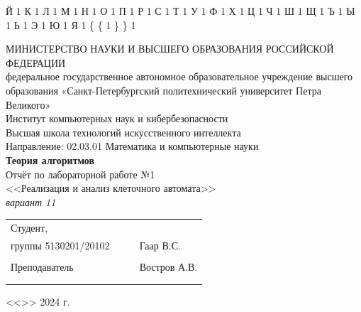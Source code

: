 \documentclass[a4paper, final]{article}
\begin{document}
{  {Й}{ {\selectfont{}} }1
  {К}{ {\selectfont{}} }1
  {Л}{ {\selectfont{}} }1
  {М}{ {\selectfont{}} }1
  {Н}{ {\selectfont{}} }1
  {О}{ {\selectfont{}} }1
  {П}{ {\selectfont{}} }1
  {Р}{ {\selectfont{}} }1
  {С}{ {\selectfont{}} }1
  {Т}{ {\selectfont{}} }1
  {У}{ {\selectfont{}} }1
  {Ф}{ {\selectfont{}} }1
  {Х}{ {\selectfont{}} }1
  {Ц}{ {\selectfont{}} }1
  {Ч}{ {\selectfont{}} }1
  {Ш}{ {\selectfont{}} }1
  {Щ}{ {\selectfont{}} }1
  {Ъ}{ {\selectfont{}} }1
  {Ы}{ {\selectfont{}} }1
  {Ь}{ {\selectfont{}} }1
  {Э}{ {\selectfont{}} }1
  {Ю}{ {\selectfont{}} }1
  {Я}{ {\selectfont{}} }1
  {\{}{ { {\color{brackets}\{} } }1 %
  {\} }{ { {\color{brackets}\} } } }1 %
}

\begin{center}
\hfill \break
\hfill \break
\normalsize{МИНИСТЕРСТВО НАУКИ И ВЫСШЕГО ОБРАЗОВАНИЯ РОССИЙСКОЙ ФЕДЕРАЦИИ\\
 федеральное государственное автономное образовательное учреждение высшего образования «Санкт-Петербургский политехнический университет Петра Великого»\\[5pt]}
\normalsize{Институт компьютерных наук и кибербезопасности}\\[5pt] 
\normalsize{Высшая школа технологий искусственного интеллекта}\\[5pt] 
\normalsize{Направление: 02.03.01 Математика и компьютерные науки}\\

\hfill \break
\hfill \break
\hfill \break
\large{\textbf{Теория алгоритмов}}\\
\large{Отчёт по лабораторной работе №1}\\
\large{<<Реализация и анализ клеточного автомата>>}\\
\large{\textit{вариант 11\\}}

\hfill \break
\hfill \break
\end{center}
 
\small{ 
\begin{tabular}{lrrl}
\!\!\!Студент, & \hspace{2cm} & & \\
\!\!\!группы 5130201/20102 & \hspace{2cm} & \underline{\hspace{3cm}} & Гаар В.С. \\\\
\!\!\!Преподаватель & \hspace{2cm} & \underline{\hspace{3cm}} &  Востров А.В. \\\\
&&\hspace{5cm}
\end{tabular}
\begin{flushright}
<<\underline{\hspace{1cm}}>>\underline{\hspace{2.5cm}} 2024 г.
\end{flushright}
}
\end{document}
